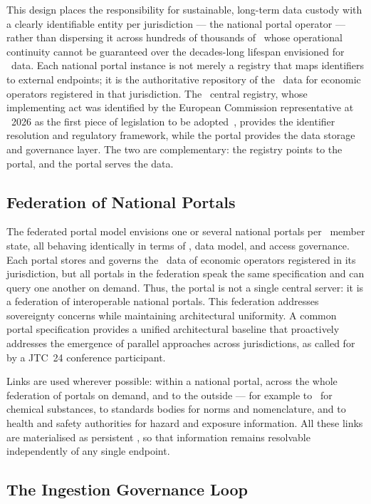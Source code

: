 This design places the responsibility for sustainable, long-term data custody
with a clearly identifiable entity per jurisdiction --- the national portal
operator --- rather than dispersing it across hundreds of thousands of \REOs\
whose operational continuity cannot be guaranteed over the decades-long lifespan
envisioned for \DPP\ data. Each national portal instance is not merely a
registry that maps identifiers to external endpoints; it is the authoritative
repository of the \DPP\ data for economic operators registered in that
jurisdiction. The \EC\ central registry, whose implementing act was identified
by the European Commission representative at \DPPforEU~2026 as the first piece
of legislation to be adopted~\cite{dpp4eu2026_day1}, provides the identifier
resolution and regulatory framework, while the portal provides the data storage
and governance layer. The two are complementary: the registry points to the
portal, and the portal serves the data.

\subsection{Federation of National Portals}

The federated portal model envisions one or several national portals per \EU\
member state, all behaving identically in terms of \API, data model, and access
governance. Each portal stores and governs the \DPP\ data of economic operators
registered in its jurisdiction, but all portals in the federation speak the same
specification and can query one another on demand. Thus, the portal is not a
single central server: it is a federation of interoperable national portals.
This federation addresses sovereignty concerns while maintaining architectural
uniformity. A common portal specification provides a unified architectural
baseline that proactively addresses the emergence of parallel approaches across
jurisdictions, as called for by a JTC~24 conference participant.

Links are used wherever possible: within a national portal, across the whole
federation of portals on demand, and to the outside --- for example to \ECHA\
for chemical substances, to standards bodies for norms and nomenclature, and to
health and safety authorities for hazard and exposure information. All these
links are materialised as persistent \IRIs, so that information remains
resolvable independently of any single endpoint.

\subsection{The Ingestion Governance Loop}

